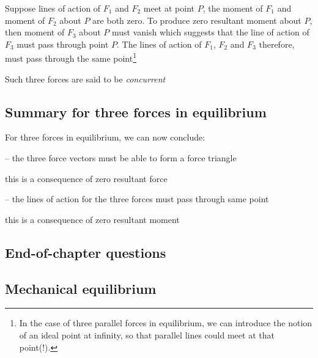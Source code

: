 Suppose lines of action of $F_1$ and $F_2$ meet at point $P$, the moment of $F_1$ and moment of $F_2$ about $P$ are both zero. To produce zero resultant moment about $P$, then moment of $F_3$ about $P$ must vanish which suggests that the line of action of $F_3$ must pass through point $P$.
The lines of action of $F_1$, $F_2$ and $F_3$ therefore, must pass through the same point\footnote{In the case of three parallel forces in equilibrium, we can introduce the notion of an ideal point at infinity, so that parallel lines could meet at that point(!).}

Such three forces are said to be \emph{concurrent}

\subsection*{Summary for three forces in equilibrium}

For three forces in equilibrium, we can now conclude:

\begin{compactenum}
	\item[--] the three force vectors must be able to form a force triangle
	
	this is a consequence of zero resultant force
	
	\item[--] the lines of action for the three forces must pass through same point
	
	this is a consequence of zero resultant moment
\end{compactenum}






\subsection{End-of-chapter questions}


\subsection*{Mechanical equilibrium}



